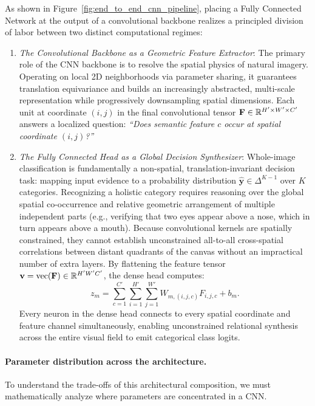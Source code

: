 As shown in Figure~\ref{fig:end_to_end_cnn_pipeline}, placing a Fully Connected Network at the output of a convolutional backbone realizes a principled division of labor between two distinct computational regimes:
\begin{enumerate}[leftmargin=*]
  \item \textit{The Convolutional Backbone as a Geometric Feature Extractor}: The primary role of the CNN backbone is to resolve the spatial physics of natural imagery. Operating on local 2D neighborhoods via parameter sharing, it guarantees translation equivariance and builds an increasingly abstracted, multi-scale representation while progressively downsampling spatial dimensions. Each unit at coordinate $(i, j)$ in the final convolutional tensor $\mathbf{F} \in \mathbb{R}^{H' \times W' \times C'}$ answers a localized question: \textit{``Does semantic feature $c$ occur at spatial coordinate $(i, j)$?''}
  
  \item \textit{The Fully Connected Head as a Global Decision Synthesizer}: Whole-image classification is fundamentally a non-spatial, translation-invariant decision task: mapping input evidence to a probability distribution $\hat{\mathbf{y}} \in \Delta^{K-1}$ over $K$ categories. Recognizing a holistic category requires reasoning over the global spatial co-occurrence and relative geometric arrangement of multiple independent parts (e.g., verifying that two eyes appear above a nose, which in turn appears above a mouth). Because convolutional kernels are spatially constrained, they cannot establish unconstrained all-to-all cross-spatial correlations between distant quadrants of the canvas without an impractical number of extra layers. By flattening the feature tensor $\mathbf{v} = \operatorname{vec}(\mathbf{F}) \in \mathbb{R}^{H' W' C'}$, the dense head computes:
    \begin{equation}
    z_m = \sum_{c=1}^{C'} \sum_{i=1}^{H'} \sum_{j=1}^{W'} W_{m, (i, j, c)} F_{i, j, c} + b_m.
    \label{eq:dense_all_to_all_synthesis}
    \end{equation}
    Every neuron in the dense head connects to every spatial coordinate and feature channel simultaneously, enabling unconstrained relational synthesis across the entire visual field to emit categorical class logits.
\end{enumerate}

\paragraph{Parameter distribution across the architecture.}
To understand the trade-offs of this architectural composition, we must mathematically analyze where parameters are concentrated in a CNN.

